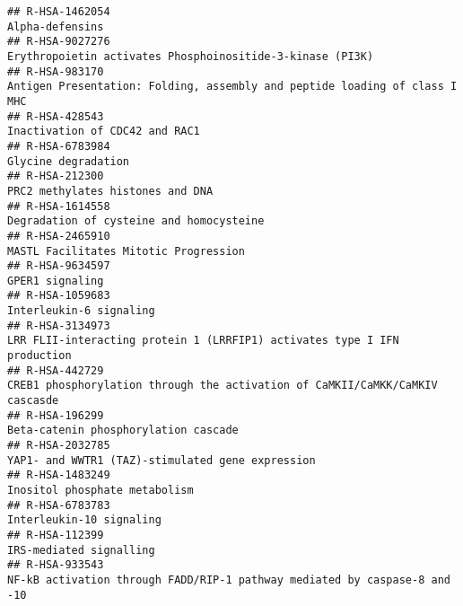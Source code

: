 \documentclass[
]{article}
\begin{document}
\begin{verbatim}
## R-HSA-1462054                                                                                                                      Alpha-defensins
## R-HSA-9027276                                                                            Erythropoietin activates Phosphoinositide-3-kinase (PI3K)
## R-HSA-983170                                                            Antigen Presentation: Folding, assembly and peptide loading of class I MHC
## R-HSA-428543                                                                                                        Inactivation of CDC42 and RAC1
## R-HSA-6783984                                                                                                                  Glycine degradation
## R-HSA-212300                                                                                                      PRC2 methylates histones and DNA
## R-HSA-1614558                                                                                             Degradation of cysteine and homocysteine
## R-HSA-2465910                                                                                                MASTL Facilitates Mitotic Progression
## R-HSA-9634597                                                                                                                      GPER1 signaling
## R-HSA-1059683                                                                                                              Interleukin-6 signaling
## R-HSA-3134973                                                             LRR FLII-interacting protein 1 (LRRFIP1) activates type I IFN production
## R-HSA-442729                                                          CREB1 phosphorylation through the activation of CaMKII/CaMKK/CaMKIV cascasde
## R-HSA-196299                                                                                                  Beta-catenin phosphorylation cascade
## R-HSA-2032785                                                                                     YAP1- and WWTR1 (TAZ)-stimulated gene expression
## R-HSA-1483249                                                                                                        Inositol phosphate metabolism
## R-HSA-6783783                                                                                                             Interleukin-10 signaling
## R-HSA-112399                                                                                                               IRS-mediated signalling
## R-HSA-933543                                                             NF-kB activation through FADD/RIP-1 pathway mediated by caspase-8 and -10

\end{verbatim}
\end{document}
